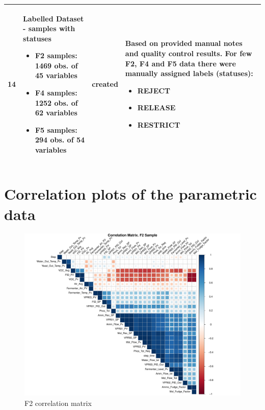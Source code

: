 \begin{landscape}
\begin{center}
\begin{longtable}{l | p{5cm} | p{1.5cm} | p{10cm}}
14&	Labelled Dataset - samples with statuses 
\begin{itemize}
    \item F2 samples: 1469 obs. of 45 variables
    \item F4 samples: 1252 obs. of 62 variables
    \item F5 samples: 294 obs. of 54 variables
\end{itemize}
&created& 	
Based on provided manual notes and quality control results.  
For few F2, F4 and F5 data there were manually assigned labels (statuses): \begin{itemize}
    \item REJECT
    \item RELEASE
    \item RESTRICT
\end{itemize}
\\
\hline
\end{longtable}
\end{center}
\end{landscape}

\section{Correlation plots of the parametric data}

\begin{figure}[ht]
    \centering
    \includegraphics[width=1\textwidth]{plots/f2_correlation.pdf}
    \caption{F2 correlation matrix}
    \label{fig:f2_correlation}
\end{figure}

